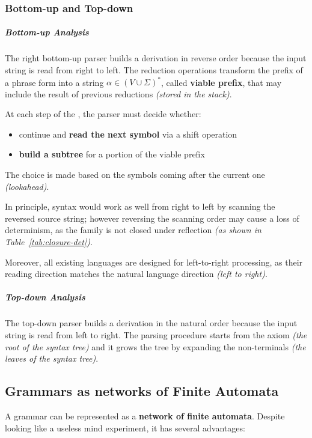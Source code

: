 \documentclass[english]{article}
\begin{document}
\subsubsection{Bottom-up and Top-down }

\subparagraph*{Bottom-up Analysis}
The right bottom-up parser builds a derivation in reverse order because the input string is read from right to left.
The reduction operations transform the prefix of a phrase form into a string \(\alpha \in \left( V \cup \Sigma \right)^\ast\), called \textbf{viable prefix}, that may include the result of previous reductions \textit{(stored in the stack)}.

At each step of the , the parser must decide whether:

\begin{itemize}
  \item continue and \textbf{read the next symbol} via a shift operation
  \item \textbf{build a subtree} for a portion of the viable prefix
\end{itemize}

The choice is made based on the symbols coming after the current one \textit{(lookahead)}.

\bigskip
In principle, syntax  would work as well from right to left by scanning the reversed source string;
however reversing the scanning order may cause a loss of determinism, as the \DET family is not closed under reflection \textit{(as shown in Table~\ref{tab:closure-det})}.

Moreover, all existing languages are designed for left-to-right processing, as their reading direction matches the natural language direction \textit{(left to right)}.

\subparagraph*{Top-down Analysis}
The top-down parser builds a derivation in the natural order because the input string is read from left to right.
The parsing procedure starts from the axiom \textit{(the root of the syntax tree)} and it grows the tree by expanding the non-terminals \textit{(the leaves of the syntax tree)}.

\subsection{Grammars as networks of Finite Automata}

A grammar can be represented as a \textbf{network of finite automata}.
Despite looking like a useless mind experiment, it has several advantages:
\end{document}
